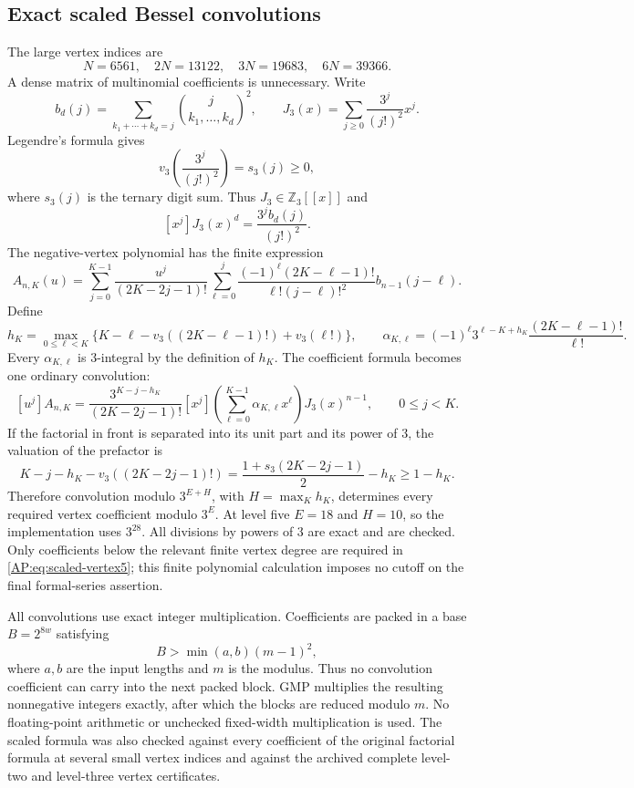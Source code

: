 \documentclass[11pt,a4paper]{article}
\theoremstyle{definition}\newtheorem{definition}[theorem]{Definition}
\theoremstyle{remark}\newtheorem{remark}[theorem]{Remark}
\numberwithin{equation}{section}
\begin{document}
\subsection{Exact scaled Bessel convolutions}
The large vertex indices are
\[
 N=6561,\quad2N=13122,\quad3N=19683,\quad6N=39366.
\]
A dense matrix of multinomial coefficients is unnecessary.  Write
\[
 b_d(j)=\sum_{k_1+\cdots+k_d=j}\binom{j}{k_1,\ldots,k_d}^{\!2},
 \qquad
 J_3(x)=\sum_{j\geq0}\frac{3^j}{(j!)^2}x^j.
\]
Legendre's formula gives
\[
 v_3\!\left(\frac{3^j}{(j!)^2}\right)=s_3(j)\geq0,
\]
where $s_3(j)$ is the ternary digit sum.  Thus $J_3\in\mathbb Z_3[[x]]$
and
\[
 [x^j]J_3(x)^d=\frac{3^j b_d(j)}{(j!)^2}.
\]
The negative-vertex polynomial has the finite expression
\[
 A_{n,K}(u)=\sum_{j=0}^{K-1}\frac{u^j}{(2K-2j-1)!}
 \sum_{\ell=0}^j
 \frac{(-1)^\ell(2K-\ell-1)!}{\ell!(j-\ell)!^2}
                   b_{n-1}(j-\ell).
\]
Define
\[
 h_K=\max_{0\leq\ell<K}
 \{K-\ell-v_3((2K-\ell-1)!)+v_3(\ell!)\},
 \qquad
 \alpha_{K,\ell}=(-1)^\ell3^{\ell-K+h_K}
                     \frac{(2K-\ell-1)!}{\ell!}.
\]
Every $\alpha_{K,\ell}$ is $3$-integral by the definition of $h_K$.
The coefficient formula becomes one ordinary convolution:
\begin{equation}\label{AP:eq:scaled-vertex5}
 [u^j]A_{n,K}=
 \frac{3^{K-j-h_K}}{(2K-2j-1)!}
 [x^j]\left(\sum_{\ell=0}^{K-1}\alpha_{K,\ell}x^\ell\right)
                  J_3(x)^{n-1},\qquad0\leq j<K.
\end{equation}
If the factorial in front is separated into its unit part and its
power of $3$, the valuation of the prefactor is
\[
 K-j-h_K-v_3((2K-2j-1)!)
       =\frac{1+s_3(2K-2j-1)}2-h_K\geq1-h_K.
\]
Therefore convolution modulo $3^{E+H}$, with
$H=\max_Kh_K$, determines every required vertex coefficient modulo
$3^E$.  At level five $E=18$ and $H=10$, so the implementation uses
$3^{28}$.  All divisions by powers of $3$ are exact and are checked.
Only coefficients below the relevant finite vertex degree are
required in \eqref{AP:eq:scaled-vertex5}; this finite polynomial
calculation imposes no cutoff on the final formal-series assertion.

All convolutions use exact integer multiplication.  Coefficients
are packed in a base $B=2^{8w}$ satisfying
\[
 B>\min(a,b)(m-1)^2,
\]
where $a,b$ are the input lengths and $m$ is the modulus.  Thus no
convolution coefficient can carry into the next packed block.
GMP multiplies the resulting nonnegative integers exactly, after
which the blocks are reduced modulo $m$.  No floating-point
arithmetic or unchecked fixed-width multiplication is used.
The scaled formula was also checked against every coefficient of
the original factorial formula at several small vertex indices and
against the archived complete level-two and level-three vertex
certificates.
\end{document}
